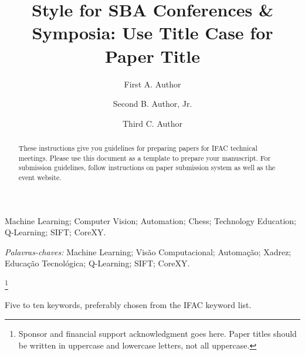 \documentclass[a4paper]{ifacconf}
\begin{document}
\begin{frontmatter}
\begin{keyword}
Machine Learning; Computer Vision; Automation; Chess; Technology Education; Q-Learning; SIFT; CoreXY.

\vskip 1mm%
{\noindent\it Palavras-chaves:} Machine Learning; Visão Computacional; Automação; Xadrez; Educação Tecnológica; Q-Learning; SIFT; CoreXY.
\end{keyword}




\end{frontmatter}
\else
% 

\begin{frontmatter}

\title{Style for SBA Conferences \& Symposia: Use Title Case for
  Paper Title} 

\thanks[footnoteinfo]{Sponsor and financial support acknowledgment
goes here. Paper titles should be written in uppercase and lowercase
letters, not all uppercase.}

\author[First]{First A. Author} 
\author[Second]{Second B. Author, Jr.} 
\author[Third]{Third C. Author}


\address[First]{Faculdade de Engenharia Elétrica, Universidade do Triângulo, MG, (e-mail: autor1@faceg@univt.br).}
\address[Second]{Faculdade de Engenharia de Controle \& Automação, Universidade do Futuro, RJ (e-mail: autor2@feca.unifutu.rj)}
\address[Third]{Electrical Engineering Department, 
   Seoul National University, Seoul, Korea, (e-mail: author3@snu.ac.kr)}
   
\renewcommand{\abstractname}{{\bf Abstract:~}}   
   
\begin{abstract}                %
These instructions give you guidelines for preparing papers for IFAC
technical meetings. Please use this document as a template to prepare
your manuscript. For submission guidelines, follow instructions on
paper submission system as well as the event website.
\end{abstract}

\begin{keyword}
Five to ten keywords, preferably chosen from the IFAC keyword list.
\end{keyword}

\end{frontmatter}
\fi
\end{document}
